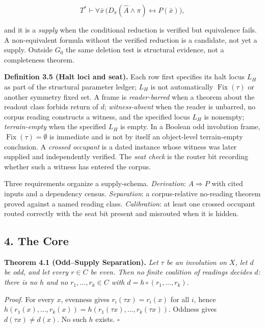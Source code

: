 \documentclass[10pt,twocolumn]{article}
\begin{document}
\[T^* \vdash \forall \bar{x}\, \bigl( D_\pi(\widehat{A} \wedge \pi) \leftrightarrow P(\bar{x}) \bigr),\]

and it is a \emph{supply} when the conditional reduction is verified but
equivalence fails. A non-equivalent formula without the verified
reduction is a candidate, not yet a supply. Outside \(G_0\) the same
deletion test is structural evidence, not a completeness theorem.

\textbf{Definition 3.5 (Halt loci and seat).} Each row first specifies
its halt locus \(L_H\) as part of the structural parameter ledger;
\(L_H\) is not automatically \(\operatorname{Fix}(\tau)\) or another
symmetry fixed set. A frame is \emph{reader-barred} when a theorem about
the readout class forbids return of \(d\); \emph{witness-absent} when
the reader is unbarred, no corpus reading constructs a witness, and the
specified locus \(L_H\) is nonempty; \emph{terrain-empty} when the
specified \(L_H\) is empty. In a Boolean odd involution frame,
\(\operatorname{Fix}(\tau) = \emptyset\) is immediate and is not by
itself an object-level terrain-empty conclusion. A \emph{crossed
occupant} is a dated instance whose witness was later supplied and
independently verified. The \emph{seat check} is the router bit
recording whether such a witness has entered the corpus.

Three requirements organize a supply-schema. \emph{Derivation}:
\(A \Rightarrow P\) with cited inputs and a dependency census.
\emph{Separation}: a corpus-relative no-reading theorem proved against a
named reading class. \emph{Calibration}: at least one crossed occupant
routed correctly with the seat bit present and misrouted when it is
hidden.

\subsection{4. The Core}\label{the-core}

\textbf{Theorem 4.1 (Odd--Supply Separation).} \emph{Let \(\tau\) be an
involution on \(X\), let \(d\) be odd, and let every \(r \in C\) be
even. Then no finite coalition of readings decides \(d\): there is no
\(h\) and no \(r_1, \dots, r_k \in C\) with
\(d = h \circ (r_1, \dots, r_k)\).}

\emph{Proof.} For every \(x\), evenness gives \(r_i(\tau x) = r_i(x)\)
for all \(i\), hence
\(h(r_1(x), \dots, r_k(x)) = h(r_1(\tau x), \dots, r_k(\tau x))\).
Oddness gives \(d(\tau x) \neq d(x)\). No such \(h\) exists. \(\square\)
\end{document}
